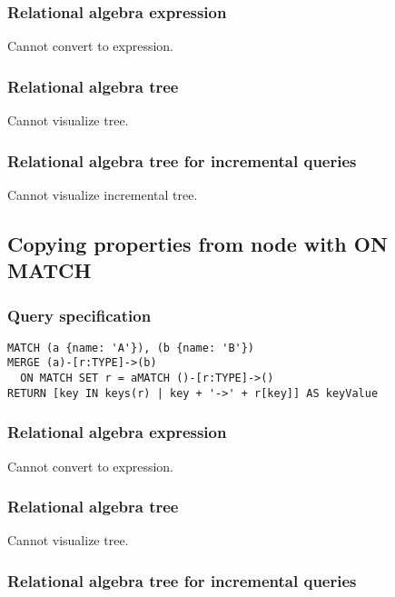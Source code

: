 \subsubsection*{Relational algebra expression}

Cannot convert to expression.

\subsubsection*{Relational algebra tree}

Cannot visualize tree.

\subsubsection*{Relational algebra tree for incremental queries}

Cannot visualize incremental tree.

\subsection{Copying properties from node with ON MATCH}

\subsubsection*{Query specification}

\begin{lstlisting}
MATCH (a {name: 'A'}), (b {name: 'B'})
MERGE (a)-[r:TYPE]->(b)
  ON MATCH SET r = aMATCH ()-[r:TYPE]->()
RETURN [key IN keys(r) | key + '->' + r[key]] AS keyValue
\end{lstlisting}

\subsubsection*{Relational algebra expression}

Cannot convert to expression.

\subsubsection*{Relational algebra tree}

Cannot visualize tree.

\subsubsection*{Relational algebra tree for incremental queries}

